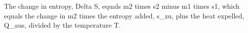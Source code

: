 The change in entropy, Delta S, equals m2 times s2 minus m1 times s1, which equals the change in m2 times the entropy added, s_zu, plus the heat expelled, Q_aus, divided by the temperature T.